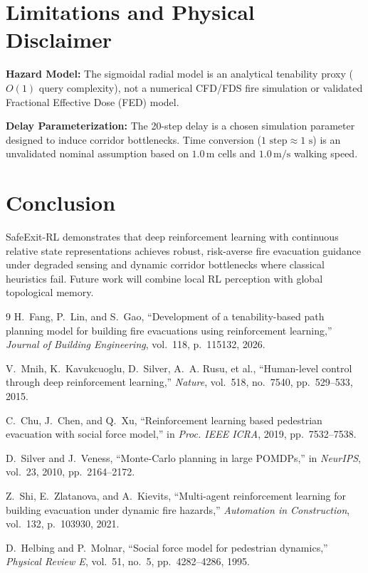 \documentclass[10pt,twocolumn]{article}
\begin{document}
\section{Limitations and Physical Disclaimer}
\textbf{Hazard Model:} The sigmoidal radial model is an analytical tenability proxy ($O(1)$ query complexity), not a numerical CFD/FDS fire simulation or validated Fractional Effective Dose (FED) model.

\textbf{Delay Parameterization:} The 20-step delay is a chosen simulation parameter designed to induce corridor bottlenecks. Time conversion ($1\text{ step} \approx 1\text{ s}$) is an unvalidated nominal assumption based on $1.0\,\mathrm{m}$ cells and $1.0\,\mathrm{m/s}$ walking speed.

\section{Conclusion}
SafeExit-RL demonstrates that deep reinforcement learning with continuous relative state representations achieves robust, risk-averse fire evacuation guidance under degraded sensing and dynamic corridor bottlenecks where classical heuristics fail. Future work will combine local RL perception with global topological memory.

\clearpage

\begin{thebibliography}{9}
H.~Fang, P.~Lin, and S.~Gao, ``Development of a tenability-based path planning model for building fire evacuations using reinforcement learning,'' \emph{Journal of Building Engineering}, vol.~118, p.~115132, 2026.

V.~Mnih, K.~Kavukcuoglu, D.~Silver, A.~A. Rusu, et al., ``Human-level control through deep reinforcement learning,'' \emph{Nature}, vol.~518, no.~7540, pp.~529--533, 2015.

C.~Chu, J.~Chen, and Q.~Xu, ``Reinforcement learning based pedestrian evacuation with social force model,'' in \emph{Proc. IEEE ICRA}, 2019, pp.~7532--7538.

D.~Silver and J.~Veness, ``Monte-Carlo planning in large POMDPs,'' in \emph{NeurIPS}, vol.~23, 2010, pp.~2164--2172.

Z.~Shi, E.~Zlatanova, and A.~Kievits, ``Multi-agent reinforcement learning for building evacuation under dynamic fire hazards,'' \emph{Automation in Construction}, vol.~132, p.~103930, 2021.

D.~Helbing and P.~Molnar, ``Social force model for pedestrian dynamics,'' \emph{Physical Review E}, vol.~51, no.~5, pp.~4282--4286, 1995.
\end{thebibliography}
\end{document}
